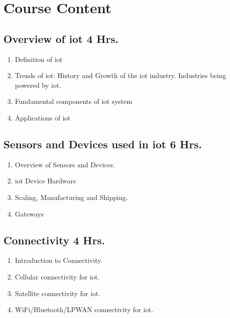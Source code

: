 \section{Course Content}

\subsection{Overview of \acrfull{iot} \hfill { 4 Hrs.}}

\begin{enumerate}
    \item Definition of \acrfull*{iot}
    \item Trends of \acrshort*{iot}: History and Growth of the \acrshort*{iot} industry. Industries being powered by \acrshort{iot}.
    \item Fundamental components of \acrshort{iot} system
    \item Applications of \acrshort{iot}
\end{enumerate}

\subsection{Sensors and Devices used in \acrshort*{iot} \hfill {6 Hrs.}}

\begin{enumerate}
    \item Overview of Sensors and Devices.
    \item \acrfull*{iot} Device Hardware
    \item Scaling, Manufacturing and Shipping.
    \item Gateways
    
\end{enumerate}

\subsection{Connectivity \hfill {4 Hrs.}}

\begin{enumerate}
    \item Introduction to Connectivity.
    \item Cellular connectivity for \acrshort{iot}.
    \item Satellite connectivity for \acrshort{iot}.
    \item WiFi/Bluetooth/LPWAN connectivity for \acrshort{iot}.
    
\end{enumerate}

